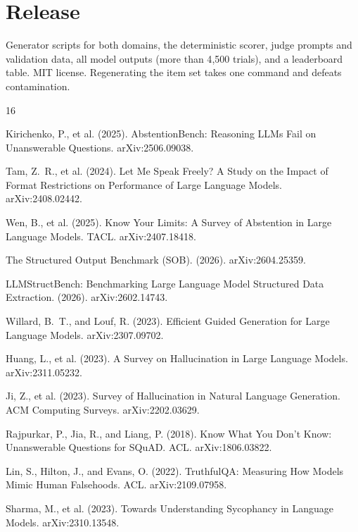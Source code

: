 \documentclass[11pt]{article}
\begin{document}
\section{Release}

Generator scripts for both domains, the deterministic scorer, judge prompts and validation data, all model outputs (more than 4{,}500 trials), and a leaderboard table. MIT license. Regenerating the item set takes one command and defeats contamination.

\begin{thebibliography}{16}

Kirichenko, P., et al. (2025). AbstentionBench: Reasoning LLMs Fail on Unanswerable Questions. arXiv:2506.09038.

Tam, Z.~R., et al. (2024). Let Me Speak Freely? A Study on the Impact of Format Restrictions on Performance of Large Language Models. arXiv:2408.02442.

Wen, B., et al. (2025). Know Your Limits: A Survey of Abstention in Large Language Models. TACL. arXiv:2407.18418.

The Structured Output Benchmark (SOB). (2026). arXiv:2604.25359.

LLMStructBench: Benchmarking Large Language Model Structured Data Extraction. (2026). arXiv:2602.14743.

Willard, B.~T., and Louf, R. (2023). Efficient Guided Generation for Large Language Models. arXiv:2307.09702.

Huang, L., et al. (2023). A Survey on Hallucination in Large Language Models. arXiv:2311.05232.

Ji, Z., et al. (2023). Survey of Hallucination in Natural Language Generation. ACM Computing Surveys. arXiv:2202.03629.

Rajpurkar, P., Jia, R., and Liang, P. (2018). Know What You Don't Know: Unanswerable Questions for SQuAD. ACL. arXiv:1806.03822.

Lin, S., Hilton, J., and Evans, O. (2022). TruthfulQA: Measuring How Models Mimic Human Falsehoods. ACL. arXiv:2109.07958.

Sharma, M., et al. (2023). Towards Understanding Sycophancy in Language Models. arXiv:2310.13548.


\end{thebibliography}
\end{document}
